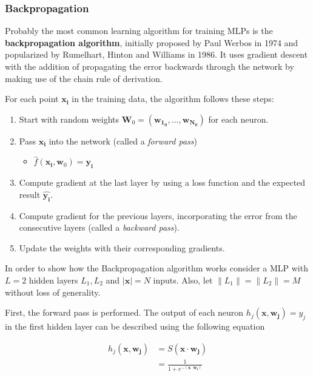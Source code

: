 \subsubsection{Backpropagation}

Probably the most common learning algorithm for training MLPs is the \textbf{backpropagation algorithm}, initially proposed by Paul Werbos in 1974 and popularized by Rumelhart, Hinton and Williams in 1986.
It uses gradient descent with the addition of propagating the error backwards through the network by making use of the chain rule of derivation.

For each point $\bm{x_i}$ in the training data, the algorithm follows these steps:

\begin{enumerate}
    \item Start with random weights $\bm{W}_0 = (\bm{w_{1_0}}, \dots, \bm{w_{N_0}})$ for each neuron.
    \item Pass $\bm{x_i}$ into the network (called a \textit{forward pass})
    \begin{itemize}
        \item $\hat{f}(\bm{x_i}, \bm{w}_0) = \bm{y_i}$
    \end{itemize}
    \item Compute gradient at the last layer by using a loss function and the expected result $\hat{\bm{y_i}}$.
    \item Compute gradient for the previous layers, incorporating the error from the consecutive layers (called a \textit{backward pass}).
    \item Update the weights with their corresponding gradients.
\end{enumerate}

In order to show how the Backpropagation algorithm works consider a MLP with $L=2$ hidden layers $L_1, L_2$ and $\left| \bm{x} \right| = N$ inputs.
Also, let $\lVert L_1 \rVert = \lVert L_2 \rVert = M$ without loss of generality.

First, the forward pass is performed.
The output of each neuron $h_j(\bm{x}, \bm{w_j}) = y_j$ in the first hidden layer can be described using the following equation

\begin{equation}
    \begin{split}
        h_j(\bm{x}, \bm{w_j})
        &= S(\bm{x} \cdot \bm{w_j}) \\
        &= \frac{1}{1 + e^{-(\bm{x} \cdot \bm{w_j})}}
    \end{split}
\end{equation}

